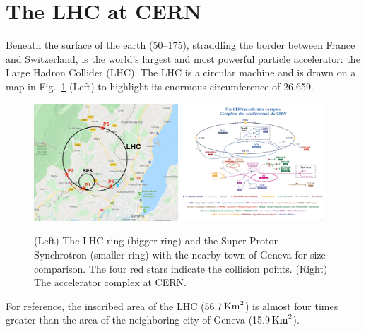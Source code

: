 \section{The LHC at CERN}
Beneath the surface of the earth (50--175\meter), straddling the border between France and Switzerland, is the world's largest and most powerful particle accelerator: the Large Hadron Collider (LHC).
The LHC is a circular machine and is drawn on a map in Fig.~\ref{fig:lhc_on_map_and_complex} (Left) to highlight its enormous circumference of 26.659\Km.
\begin{figure}[b]
    \centering
    \includegraphics[width=0.48\textwidth,keepaspectratio]{figures/lhc/lhc_drawn_on_map_withpoints.png}
    \includegraphics[width=0.48\textwidth,keepaspectratio]{figures/lhc/cern_complex.png}
        \caption{
        (Left) The LHC ring (bigger ring) and the Super Proton Synchrotron (smaller ring) with the nearby town of Geneva for size comparison. 
        The four red stars indicate the \pp collision points. 
        (Right) The accelerator complex at CERN.
        } 
        \label{fig:lhc_on_map_and_complex}
    \end{figure}
For reference, the inscribed area of the LHC (56.7$\,\text{Km}^{2}$) is almost four times greater than the area of the neighboring city of Geneva (15.9$\,\text{Km}^{2}$).

